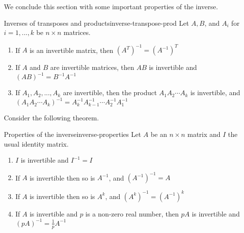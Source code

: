 We conclude this section with some important properties of the inverse. 

\begin{theorem}{Inverses of transposes and products}{inverse-transpose-prod}
  Let $A, B$, and $A_i$ for $i=1,...,k$ be $n \times n$ matrices. 
  \begin{enumerate}
  \item
    If $A$ is an invertible matrix, then $(A^{T})^{-1} = (A^{-1})^{T}$
  \item
    If $A$ and $B$ are invertible matrices, then $AB$ is invertible and $(AB)^{-1} = B^{-1}A^{-1}$
  \item
    If $A_1, A_2, ..., A_k$ are invertible, then the product $A_1A_2 \cdots A_k$ is invertible, and $(A_1A_2 \cdots A_k)^{-1} = A_k^{-1}A_{k-1}^{-1} \cdots A_2^{-1}A_1^{-1}$
  \end{enumerate}
\end{theorem}

Consider the following theorem.

\begin{theorem}{Properties of the inverse}{inverse-properties}
  Let $A$ be an $n \times n$ matrix and $I$ the usual identity matrix. 
  \begin{enumerate}
  \item
    $I$ is invertible and $I^{-1} = I$
  \item
    If $A$ is invertible then so is $A^{-1}$, and $(A^{-1})^{-1} = A$
  \item
    If $A$ is invertible then so is $A^k$, and $(A^k)^{-1} = (A^{-1})^k$
  \item
    If $A$ is invertible and $p$ is a non-zero real number, then $pA$ is invertible and $(pA)^{-1} = \frac{1}{p}A^{-1}$
  \end{enumerate}
\end{theorem}
